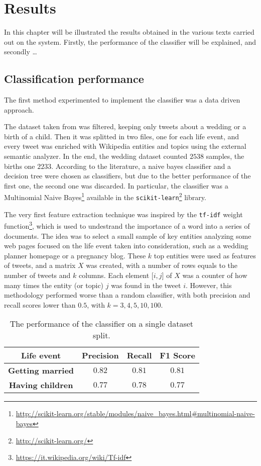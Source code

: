 \chapter{Results}
\label{cha:results}
In this chapter will be illustrated the results obtained in the various texts carried out on the system. Firstly, the performance of the classifier will be explained, and secondly \dots

\section{Classification performance}
The first method experimented to implement the classifier was a data driven approach. 

The dataset taken from \cite{dickinson2015identifying} was filtered, keeping only tweets about a wedding or a birth of a child. Then it was splitted in two files, one for each life event, and every tweet was enriched with Wikipedia entities and topics using the external semantic analyzer. In the end, the wedding dataset counted $2538$ samples, the births one $2233$. According to the literature, a naive bayes classifier and a decision tree were chosen as classifiers, but due to the better performance of the first one, the second one was discarded. In particular, the classifier was a Multinomial Naive Bayes\footnote{\url{http://scikit-learn.org/stable/modules/naive_bayes.html#multinomial-naive-bayes}} available in the \texttt{scikit-learn}\footnote{\url{http://scikit-learn.org/}} library.

The very first feature extraction technique was inspired by the \texttt{tf-idf} weight function\footnote{\url{https://it.wikipedia.org/wiki/Tf-idf}}, which is used to undestrand the importance of a word into a series of documents. The idea was to select a small sample of key entities analyzing some web pages focused on the life event taken into consideration, such as a wedding planner homepage or a pregnancy blog. These $k$ top entities were used as features of tweets, and a matrix $X$ was created, with a number of rows equals to the number of tweets and $k$ columns. Each element [$i,j$] of $X$ was a counter of how many times the entity (or topic) $j$ was found in the tweet $i$. However, this methodology performed worse than a random classifier, with both precision and recall scores lower than $0.5$, with $k = 3, 4, 5, 10, 100$.

\begin{table}
\begin{center}
\begin{tabular}{cccc}
\hline
Life event & Precision & Recall & F1 Score \\
\hline
\textbf{Getting married} & $0.82$ & $0.81$ & $0.81$ \\
\textbf{Having children} & $0.77$ & $0.78$ & $0.77$ \\
\hline
\end{tabular}
\end{center}
\caption{The performance of the classifier on a single dataset split.}
\label{tab:singlesplit}
\end{table}

